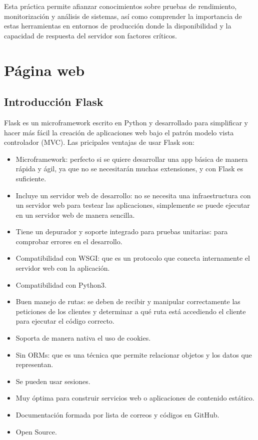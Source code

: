 \documentclass[10pt]{book}
\begin{document}
Esta práctica permite afianzar conocimientos sobre pruebas de rendimiento, monitorización y análisis de sistemas, así como comprender la importancia de estas herramientas en entornos de producción donde la disponibilidad y la capacidad de respuesta del servidor son factores críticos.\\


\chapter{Página web}

\section{Introducción Flask}\cite{openwebinars_flask} \cite{flask_docs}
    Flask es un microframework escrito en Python y desarrollado para simplificar y hacer más fácil la creación de aplicaciones web bajo el patrón modelo vista controlador (MVC). Las pricipales ventajas de usar Flask son:
        \begin{itemize}
            \item Microframework: perfecto si se quiere desarrollar una app básica de manera rápida y ágil, ya que no se necesitarán muchas extensiones, y con Flask es suficiente.
            \item Incluye un servidor web de desarrollo: no se necesita una infraestructura con un servidor web para testear las aplicaciones, simplemente se puede ejecutar en un servidor web de manera sencilla.
            \item Tiene un depurador y soporte integrado para pruebas unitarias: para comprobar errores en el desarrollo.
            \item Compatibilidad con WSGI: que es un protocolo que conecta internamente el servidor web con la aplicación.
            \item Compatibilidad con Python3.
            \item Buen manejo de rutas: se deben de recibir y manipular correctamente las peticiones de los clientes y determinar a qué ruta está accediendo el cliente para ejecutar el código correcto.
            \item Soporta de manera nativa el uso de cookies.
            \item Sin ORMs: que es una técnica que permite relacionar objetos y los datos que representan.
            \item Se pueden usar sesiones.
            \item Muy óptima para construir servicios web o aplicaciones de contenido estático.
            \item Documentación formada por lista de correos y códigos en GitHub.
            \item Open Source.
        \end{itemize}
\end{document}
